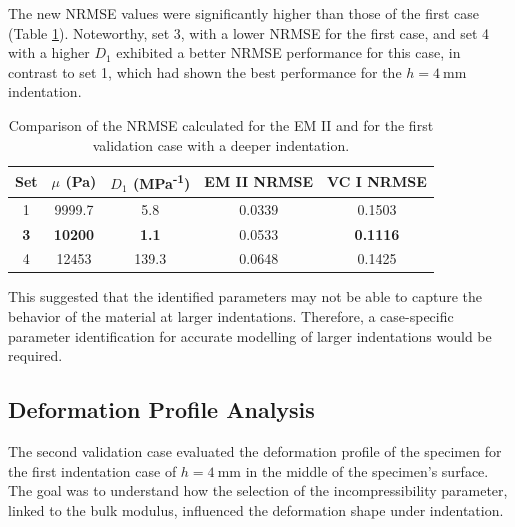 The new NRMSE values were significantly higher than those of the first case (Table \ref{tab:nrmse8mm}). 
Noteworthy, set \SI{3}{}, with a lower NRMSE for the first case, and set \SI{4}{} with a higher $D_1$ 
exhibited a better NRMSE performance for this case, in contrast to set \SI{1}{}, which had shown 
the best performance for the $h=\SI{4}{\milli \meter}$ indentation.\\

\begin{table}[ht!]
    \centering
    \begin{tabular}{|c|c|c|c|c|}
    \hline
    Set & $\mu$ (Pa) & $D_1$ (MPa\textsuperscript{-1}) & EM II NRMSE & \textbf{VC I NRMSE}\\
    \hline
    1 & 9999.7 & 5.8 & 0.0339 & 0.1503\\
    \textbf{3} & \textbf{10200} & \textbf{1.1} & 0.0533 & \textbf{0.1116}\\
    4 & 12453 & 139.3 & 0.0648 & 0.1425\\
    \hline
    \end{tabular}
    \caption[NRMSE for first validation case]{Comparison of the NRMSE calculated for the EM II and for the first validation case with a deeper indentation.}
	\label{tab:nrmse8mm}
\end{table}

This suggested that the identified parameters may not be able to capture the behavior 
of the material at larger indentations. Therefore, a case-specific parameter identification
for accurate modelling of larger indentations would be required.\\

\subsection{Deformation Profile Analysis}
\label{subsection:defprofanalysis}
The second validation case evaluated the deformation profile of the specimen for the first 
indentation case of $h=\SI{4}{\milli \meter}$ in the middle of the specimen's surface. The goal 
was to understand how the selection of the incompressibility parameter, linked to the 
bulk modulus, influenced the deformation shape under indentation.\\

